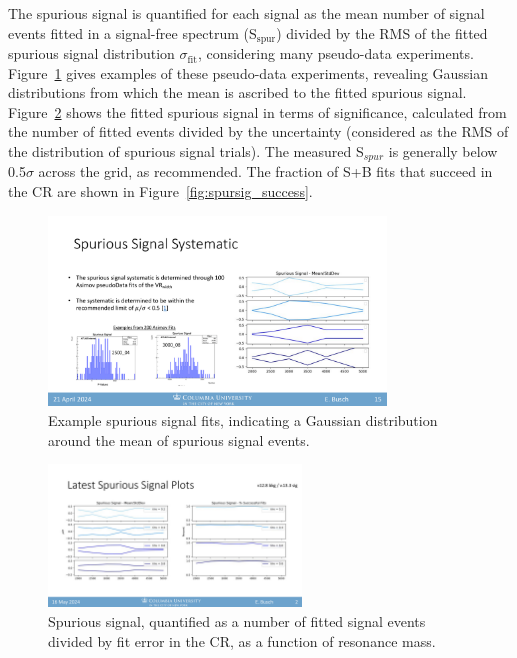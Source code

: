 The spurious signal is quantified for each signal as the mean number of signal events fitted in a signal-free spectrum (S$_{\text{spur}}$) divided by the RMS of the fitted spurious signal distribution $\sigma_{\text{fit}}$, considering many pseudo-data experiments.
Figure~\ref{fig:spursig_ex} gives examples of these pseudo-data experiments, revealing Gaussian distributions from which the mean is ascribed to the fitted spurious signal.
Figure~\ref{fig:spursig} shows the fitted spurious signal in terms of significance, calculated from the number of fitted events divided by the uncertainty (considered as the RMS of the distribution of spurious signal trials).
The measured S$_{spur}$ is generally below 0.5$\sigma$ across the grid, as recommended. 
The fraction of S+B fits that succeed in the CR are shown in Figure~\ref{fig:spursig_success}.
\begin{figure}[!htbp]
\centering
   \includegraphics[width=0.8\textwidth]{figures/systs/spursig_ex}
    \caption{Example spurious signal fits, indicating a Gaussian distribution around the mean of spurious signal events.
    \label{fig:spursig_ex}}
\end{figure}
\begin{figure}[!htbp]
\centering
   \includegraphics[width=0.6\textwidth]{figures/systs/spursig}
    \caption{Spurious signal, quantified as a number of fitted signal events divided by fit error in the CR, as a function of resonance mass.
    \label{fig:spursig}}
\end{figure}
